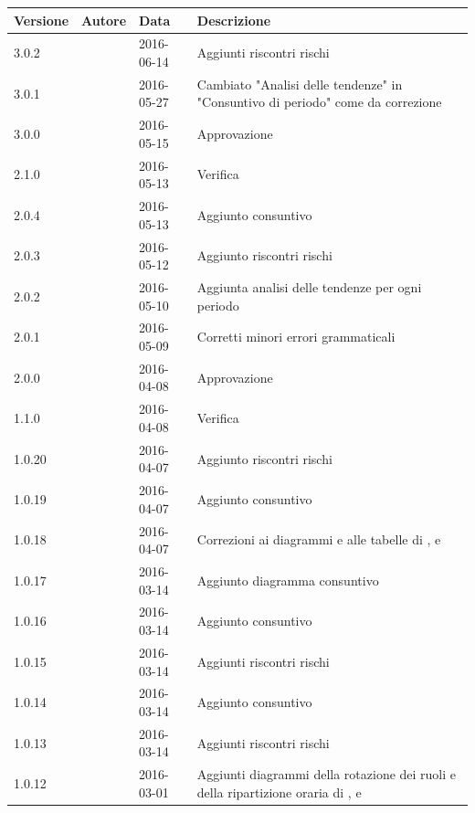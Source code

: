 \documentclass[12pt,a4paper]{article}
\begin{document}
\begin{center}
	\begin{longtable}[H]{p{} p{} p{} p{}}
		\toprule
		\textbf{Versione} & \textbf{Autore} & \textbf{Data}	&	\textbf{Descrizione}\\*
		\midrule
		\midrule
		3.0.2 & \TP{} & 2016-06-14 & Aggiunti riscontri rischi \\*
		\midrule
		3.0.1 & \TP{} & 2016-05-27 & Cambiato "Analisi delle tendenze" in "Consuntivo di periodo" come da correzione \\*
		\midrule
		3.0.0 & \AVE{} & 2016-05-15 & Approvazione \\*
		\midrule
		2.1.0 & \NDC{} & 2016-05-13 & Verifica \\*
		\midrule
		2.0.4 & \WS{} & 2016-05-13 & Aggiunto consuntivo \FC{} \\*
		\midrule
		2.0.3 & \AVE{} & 2016-05-12 & Aggiunto riscontri rischi \FC{} \\*
		\midrule
		2.0.2 & \AVE{} & 2016-05-10 & Aggiunta analisi delle tendenze per ogni periodo \\*
		\midrule
		2.0.1 & \WS{} & 2016-05-09 & Corretti minori errori grammaticali \\*
        \midrule
        2.0.0 & \TP{} & 2016-04-08 & Approvazione \\*
   		\midrule
   		1.1.0 & \NDC{} & 2016-04-08 & Verifica \\*
		\midrule
		1.0.20 & \TP{} & 2016-04-07 & Aggiunto riscontri rischi \FPD{} \\*
		\midrule
		1.0.19 & \TP{} & 2016-04-07 & Aggiunto consuntivo \FPD{} \\*
		\midrule
		1.0.18 & \TP{} & 2016-04-07 & Correzioni ai diagrammi e alle tabelle di \FAD, \FPA e \FPD{} \\*
		\midrule
		1.0.17 & \AB{} & 2016-03-14 & Aggiunto diagramma consuntivo \FPA \\*
        \midrule
	    1.0.16 & \AB{} & 2016-03-14 & Aggiunto consuntivo \FPA{} \\*
        \midrule
        1.0.15 & \AB{} & 2016-03-14 & Aggiunti riscontri rischi \FPA{} \\*
        \midrule
        1.0.14 & \AB{} & 2016-03-14 & Aggiunto consuntivo \FAD{} \\*
        \midrule
        1.0.13 & \AB{} & 2016-03-14 & Aggiunti riscontri rischi \FAD{} \\*
        \midrule
	    1.0.12 & \AB{} & 2016-03-01 & Aggiunti diagrammi della rotazione dei ruoli e della ripartizione oraria di \FAD, \FPA e \FPD{} \\*

\end{longtable}
\end{center}
\end{document}
